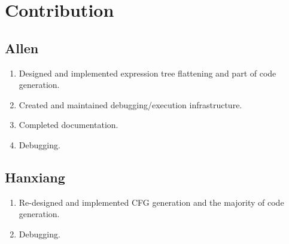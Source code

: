 \newpage

\section{Contribution}

\subsection{Allen}
\begin{enumerate}
    \item Designed and implemented expression tree flattening and part of code generation.
    \item Created and maintained debugging/execution infrastructure.
    \item Completed documentation.
    \item Debugging.
\end{enumerate}

\subsection{Hanxiang}
\begin{enumerate}
    \item Re-designed and implemented CFG generation and the majority of code generation.
    \item Debugging.
\end{enumerate}